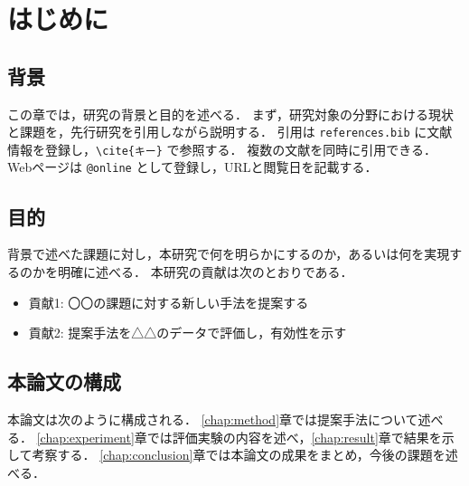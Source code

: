 \documentclass[main]{subfiles}
\begin{document}
\chapter{はじめに}
\label{chap:introduction}
\section{背景}
この章では，研究の背景と目的を述べる．
まず，研究対象の分野における現状と課題を，先行研究を引用しながら説明する．
引用は \texttt{references.bib} に文献情報を登録し，\verb|\cite{キー}| で参照する\cite{lamport1994latex}．
複数の文献を同時に引用できる\cite{knuth1986texbook,knuth1981breaking}．
Webページは \texttt{@online} として登録し，URLと閲覧日を記載する\cite{ctan_luatexja}．\par

\section{目的}
背景で述べた課題に対し，本研究で何を明らかにするのか，あるいは何を実現するのかを明確に述べる．
本研究の貢献は次のとおりである．
\begin{itemize}
  \item 貢献1: 〇〇の課題に対する新しい手法を提案する
  \item 貢献2: 提案手法を△△のデータで評価し，有効性を示す
\end{itemize}

\section{本論文の構成}
本論文は次のように構成される．
\ref{chap:method}章では提案手法について述べる．
\ref{chap:experiment}章では評価実験の内容を述べ，\ref{chap:result}章で結果を示して考察する．
\ref{chap:conclusion}章では本論文の成果をまとめ，今後の課題を述べる．
\end{document}
